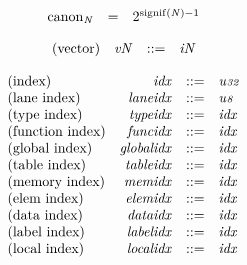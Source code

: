 $$
\begin{array}{@{}lcl@{}l@{}}
{{\mathrm{canon}}}_{{\mathit{N}}} &=& {2^{{\mathrm{signif}}({\mathit{N}}) - 1}} &  \\
\end{array}
$$

\vspace{1ex}

$$
\begin{array}{@{}lrrl@{}l@{}}
\mbox{(vector)} & {{\mathit{v}}}{{\mathit{N}}} &::=& {{\mathit{i}}}{{\mathit{N}}} \\
\end{array}
$$

\vspace{1ex}

$$
\begin{array}{@{}lrrl@{}l@{}}
\mbox{(index)} & {\mathit{idx}} &::=& {\mathit{u{\scriptstyle32}}} \\
\mbox{(lane index)} & {\mathit{laneidx}} &::=& {\mathit{u{\scriptstyle8}}} \\
\mbox{(type index)} & {\mathit{typeidx}} &::=& {\mathit{idx}} \\
\mbox{(function index)} & {\mathit{funcidx}} &::=& {\mathit{idx}} \\
\mbox{(global index)} & {\mathit{globalidx}} &::=& {\mathit{idx}} \\
\mbox{(table index)} & {\mathit{tableidx}} &::=& {\mathit{idx}} \\
\mbox{(memory index)} & {\mathit{memidx}} &::=& {\mathit{idx}} \\
\mbox{(elem index)} & {\mathit{elemidx}} &::=& {\mathit{idx}} \\
\mbox{(data index)} & {\mathit{dataidx}} &::=& {\mathit{idx}} \\
\mbox{(label index)} & {\mathit{labelidx}} &::=& {\mathit{idx}} \\
\mbox{(local index)} & {\mathit{localidx}} &::=& {\mathit{idx}} \\
\end{array}
$$

\vspace{1ex}

\vspace{1ex}


